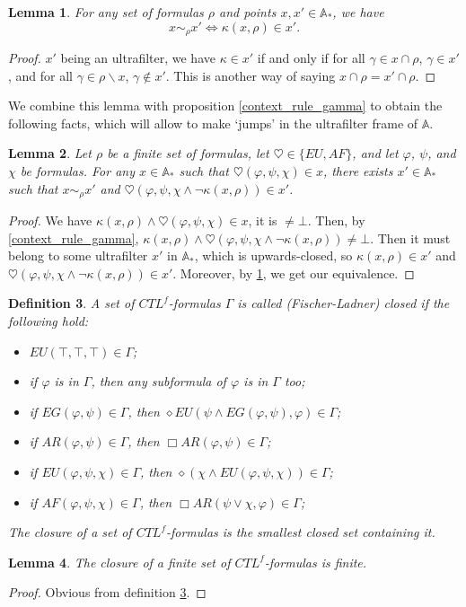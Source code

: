 \documentclass[11pt]{article}
\newcommand{\A}{{\mathbb A}}
\newtheorem{definition}{Definition}[section]
\newtheorem{lemma}[definition]{Lemma}
\begin{document}
\begin{lemma}\label{equiv_as_kappa}
    For any set of formulas $\rho$ and points $x,x'\in\A_*$, we have \[x\sim_\rho x' \Leftrightarrow \kappa(x,\rho)\in x'.\] 
\end{lemma}
\begin{proof}
    $x'$ being an ultrafilter, we have $\kappa\in x'$ if and only if for all $\gamma\in x\cap\rho$, $\gamma\in x'$, and for all $\gamma\in \rho\backslash x$, $\gamma\notin x'$. This is another way of saying $x\cap\rho = x'\cap\rho$.
\end{proof}
We combine this lemma with proposition \ref{context_rule_gamma} to obtain the following facts, which will allow to make `jumps' in the ultrafilter frame of $\A$.
\begin{lemma}
    Let $\rho$ be a finite set of formulas, let $\heartsuit\in\{EU,AF\}$, and let $\varphi$, $\psi$, and $\chi$ be formulas. For any $x\in\A_*$ such that $\heartsuit(\varphi,\psi,\chi)\in x$, there exists $x'\in\A_*$ such that $x\sim_\rho x'$ and $\heartsuit(\varphi,\psi,\chi\wedge\neg\kappa(x,\rho))\in x'$.
\end{lemma}
\begin{proof}
    We have $\kappa(x,\rho)\wedge\heartsuit(\varphi,\psi,\chi)\in x$, it is $\not=\bot$. Then, by \ref{context_rule_gamma}, $\kappa(x,\rho)\wedge\heartsuit(\varphi,\psi,\chi\wedge\neg\kappa(x,\rho))\not=\bot$. Then it must belong to some ultrafilter $x'$ in $\A_*$, which is upwards-closed, so $\kappa(x,\rho)\in x'$ and $\heartsuit(\varphi,\psi,\chi\wedge\neg\kappa(x,\rho))\in x'$. Moreover, by \ref{equiv_as_kappa}, we get our equivalence.
\end{proof}
\begin{definition}\label{F-L closure}
    A set of $CTL^f$-formulas $\Gamma$ is called \emph{(Fischer-Ladner) closed} if the following hold:
    \begin{itemize}
        \setlength\itemsep{0em}
        \item $EU(\top,\top,\top)\in\Gamma$;
        \item if $\varphi$ is in $\Gamma$, then any subformula of $\varphi$ is in $\Gamma$ too;
        \item if $EG(\varphi,\psi)\in\Gamma$, then $\diamond EU(\psi\wedge EG(\varphi,\psi),\varphi)\in\Gamma$;
        \item if $AR(\varphi,\psi)\in\Gamma$, then $\Box AR(\varphi,\psi)\in\Gamma$;
        \item if $EU(\varphi,\psi,\chi)\in\Gamma$, then $\diamond(\chi\wedge EU(\varphi,\psi,\chi))\in\Gamma$;
        \item if $AF(\varphi,\psi,\chi)\in\Gamma$, then $\Box AR(\psi\vee\chi,\varphi)\in\Gamma$;
    \end{itemize}
    The \emph{closure} of a set of $CTL^f$-formulas is the smallest closed set containing it. 
\end{definition}
\begin{lemma}\label{finite_closure}
    The closure of a finite set of $CTL^f$-formulas is finite.
\end{lemma}
\begin{proof}
    Obvious from definition \ref{F-L closure}.
\end{proof}
\end{document}
